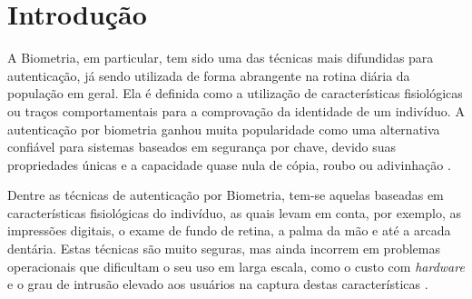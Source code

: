 
\chapter{Introdução}


A Biometria, em particular, tem sido uma das técnicas mais difundidas para autenticação, já sendo utilizada de forma abrangente na rotina diária da população em geral. Ela é definida como a utilização de características fisiológicas ou traços comportamentais para a comprovação da identidade de um indivíduo. A autenticação por biometria ganhou muita popularidade como uma alternativa confiável para sistemas baseados em segurança por chave, devido suas propriedades únicas e a capacidade quase nula de cópia, roubo ou adivinhação \cite{kholmatov}.

Dentre as técnicas de autenticação por Biometria, tem-se aquelas baseadas em características fisiológicas do indivíduo, as quais levam em conta, por exemplo, as impressões digitais, o exame de fundo de retina, a palma da mão e até a arcada dentária. Estas técnicas são muito seguras, mas ainda incorrem em problemas operacionais que dificultam o seu uso em larga escala, como o custo com \emph{hardware} e o grau de intrusão elevado aos usuários na captura destas características \cite{heinen2002}. 

